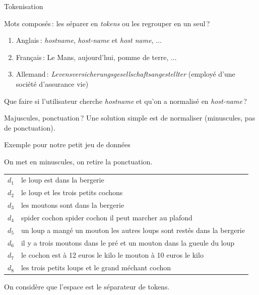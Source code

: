 \begin{frame}{Tokenisation}

\alert{Mots composés}\,: les séparer en \emph{tokens} ou les regrouper en un seul\,?

\begin{enumerate}
   \item Anglais\,: \emph{hostname}, \emph{host-name} et \emph{host
name}, ...
  \item Français\,: Le Mans, aujourd'hui, pomme de terre, ...
  \item Allemand\,: \emph{Levensversicherungsgesellschaftsangestellter} (employé d’une
société d’assurance vie)
\end{enumerate}

\vfill

 Que faire si l'utilisateur
cherche \emph{hostname} et qu'on a normalisé en \emph{host-name}\,?

\vfill
\begin{blocgauche}
Majuscules, ponctuation\,? Une solution simple est de normaliser (minuscules, pas de ponctuation).
\end{blocgauche}

\end{frame}

\begin{frame}{Exemple pour notre petit jeu de données}

On met en minuscules, on retire la ponctuation.

\vfill

\begin{tabular}{>{\color{structure.fg}}ll}
     $d_1$&le loup est dans la bergerie\\
     $d_2$&le loup et les trois petits cochons\\
     $d_3$&les moutons sont dans la bergerie\\
     $d_4$&spider cochon spider cochon il peut marcher au plafond\\
     $d_5$&un loup a mangé un mouton les autres loups sont restés dans la bergerie\\
     $d_6$&il y a trois moutons dans le pré et un mouton dans la gueule du loup\\
     $d_7$&le cochon est à 12 euros le kilo le mouton à  10 euros le kilo\\
     $d_8$&les trois petits loups et le grand méchant cochon\\
\end{tabular}

\vfill

On considère que l'espace est le séparateur de tokens.

\end{frame}


